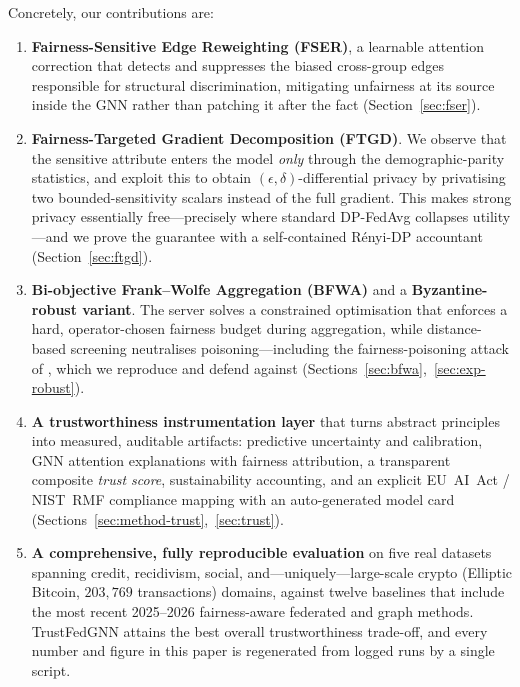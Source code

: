 \documentclass[pdflatex,sn-mathphys-num]{sn-jnl}
\theoremstyle{thmstyleone}%
\theoremstyle{thmstyletwo}%
\theoremstyle{thmstylethree}%
\begin{document}
\medskip
\noindent Concretely, our contributions are:
\begin{enumerate}
\item \textbf{Fairness-Sensitive Edge Reweighting (FSER)}, a learnable attention
correction that detects and suppresses the biased cross-group edges responsible
for structural discrimination, mitigating unfairness at its source inside the
GNN rather than patching it after the fact (Section~\ref{sec:fser}).

\item \textbf{Fairness-Targeted Gradient Decomposition (FTGD)}. We observe that
the sensitive attribute enters the model \emph{only} through the
demographic-parity statistics, and exploit this to obtain
$(\epsilon,\delta)$-differential privacy by privatising two bounded-sensitivity
scalars instead of the full gradient. This makes strong privacy essentially
free---precisely where standard DP-FedAvg collapses utility---and we prove the
guarantee with a self-contained R\'enyi-DP accountant (Section~\ref{sec:ftgd}).

\item \textbf{Bi-objective Frank--Wolfe Aggregation (BFWA)} and a
\textbf{Byzantine-robust variant}. The server solves a constrained optimisation
that enforces a hard, operator-chosen fairness budget during aggregation, while
distance-based screening neutralises poisoning---including the
fairness-poisoning attack of \cite{kasyap2025attack}, which we reproduce and
defend against (Sections~\ref{sec:bfwa},~\ref{sec:exp-robust}).

\item \textbf{A trustworthiness instrumentation layer} that turns abstract
principles into measured, auditable artifacts: predictive uncertainty and
calibration, GNN attention explanations with fairness attribution, a transparent
composite \emph{trust score}, sustainability accounting, and an explicit
EU~AI~Act / NIST~RMF compliance mapping with an auto-generated model card
(Sections~\ref{sec:method-trust},~\ref{sec:trust}).

\item \textbf{A comprehensive, fully reproducible evaluation} on five real
datasets spanning credit, recidivism, social, and---uniquely---large-scale
crypto (Elliptic Bitcoin, $203{,}769$ transactions) domains, against twelve
baselines that include the most recent 2025--2026 fairness-aware federated and
graph methods. TrustFedGNN attains the best overall trustworthiness trade-off,
and every number and figure in this paper is regenerated from logged runs by a
single script.
\end{enumerate}
\end{document}
